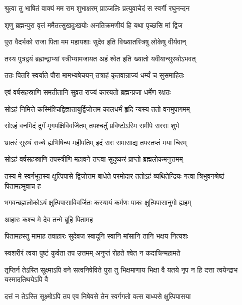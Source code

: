 
\twolineshloka
{श्रुत्वा तु भाषितं वाक्यं मम राम शुभाक्षरम्}
{प्राञ्जलिः प्रत्युवाचेदं स स्वर्गी रघुनन्दन} %

\twolineshloka
{शृणु ब्रह्मन्पुरा वृत्तं ममैतत्सुखदुःखयोः}
{अनतिक्रमणीयं हि यथा पृच्छसि मां द्विज} %

\twolineshloka
{पुरा वैदर्भको राजा पिता मम महायशाः}
{सुदेव इति विख्यातस्त्रिषु लोकेषु वीर्यवान्} %

\twolineshloka
{तस्य पुत्रद्वयं ब्रह्मन्द्वाभ्यां स्त्रीभ्यामजायत}
{अहं श्वेत इति ख्यातो यवीयान्सुरथोऽभवत्} %

\twolineshloka
{ततः पितरि स्वर्याते पौरा मामभ्यषेचयन्}
{तत्राहं कृतवान्राज्यं धर्म्यं च सुसमाहितः} %

\twolineshloka
{एवं वर्षसहस्राणि समतीतानि सुव्रत}
{राज्यं कारयतो ब्रह्मन्प्रजा धर्मेण रक्षतः} %

\twolineshloka
{सोऽहं निमित्ते कस्मिंश्चिद्विज्ञातायुर्द्विजोत्तम}
{कालधर्मं हृदि न्यस्य ततो वनमुपागमम्} %

\twolineshloka
{सोऽहं वनमिदं दुर्गं मृगपक्षिविवर्जितम्}
{तपश्चर्तुं प्रविष्टोऽस्मि समीपे सरसः शुभे} %

\twolineshloka
{भ्रातरं सुरथं राज्ये ह्यभिषिच्य महीपतिम्}
{इदं सरः समासाद्य तपस्तप्तं मया चिरम्} %

\twolineshloka
{सोऽहं वर्षसहस्राणि तपस्त्रीणि महावने}
{तप्त्वा सुदुष्करं प्राप्तो ब्रह्मलोकमनुत्तमम्} %

\threelineshloka
{तस्य मे स्वर्गभूतस्य क्षुत्पिपासे द्विजोत्तम}
{बाधेते परमोदार ततोऽहं व्यथितेन्द्रियः}
{गत्वा त्रिभुवनश्रेष्ठं पितामहमुवाच ह} %

\twolineshloka
{भगवन्ब्रह्मलोकोऽयं क्षुत्पिपासाविवर्जितः}
{कस्यायं कर्मणः पाकः क्षुत्पिपासानुगो ह्यहम्} %

\onelineshloka
{आहारः कश्च मे देव तन्मे ब्रूहि पितामह} %

\twolineshloka
{पितामहस्तु मामाह तवाहारः सुदेवज}
{स्वादूनि स्वानि मांसानि तानि भक्षय नित्यशः} %

\twolineshloka
{स्वशरीरं त्वया पुष्टं कुर्वता तप उत्तमम्}
{अनुप्तं रोहते श्वेत न कदाचिन्महामते} %

\threelineshloka
{तृप्तिर्न तेऽस्ति सूक्ष्माऽपि वने सत्वनिषेविते}
{पुरा तु भिक्षमाणाय भिक्षा वै यतये नृप}
{न हि दत्ता त्वयेन्द्राभ यस्मादतिथयेऽपि वै} %

\twolineshloka
{दत्तं न तेऽस्ति सूक्ष्मोऽपि तप एव निषेवसे}
{तेन स्वर्गगतो वत्स बाध्यसे क्षुत्पिपासया} %

